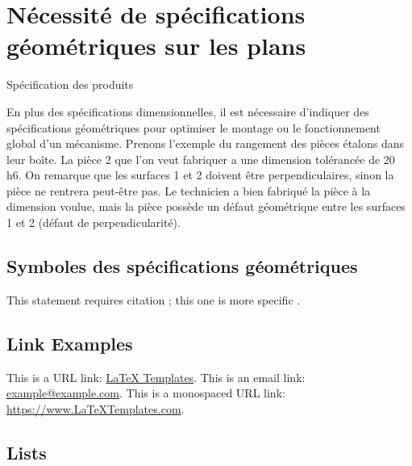 \documentclass[
	11pt, %
	fleqn, %
	a4paper, %
]{LegrandOrangeBook}
\begin{document}

\chapter{Nécessité de spécifications géométriques sur les plans}
\begin{corollary}[S6.1]
Spécification des produits
\end{corollary}

En plus des spécifications dimensionnelles, il est nécessaire d’indiquer des spécifications géométriques pour optimiser le montage ou le fonctionnement global d’un mécanisme.
Prenons l’exemple du rangement des pièces étalons dans leur boîte. La pièce 2 que l’on veut fabriquer a une dimension tolérancée de 20 h6.
On remarque que les surfaces 1 et 2 doivent être perpendiculaires, sinon la pièce ne rentrera peut-être pas. Le technicien a bien fabriqué la pièce à la dimension voulue, mais la pièce possède un défaut géométrique entre les surfaces 1 et 2 (défaut de perpendicularité).

\section{Symboles des spécifications géométriques}

This statement requires citation \cite{Smith:2022jd}; this one is more specific \cite[162]{Smith:2021qr}.


\section{Link Examples}

This is a URL link: \href{https://www.latextemplates.com}{LaTeX Templates}. This is an email link: \href{mailto:example@example.com}{example@example.com}. This is a monospaced URL link: \url{https://www.LaTeXTemplates.com}.


\section{Lists}
\end{document}
